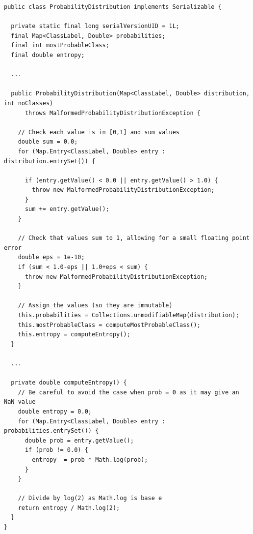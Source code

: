 \documentclass[12pt,twoside,notitlepage]{report}
\begin{document}
                \begin{lstlisting}[caption={The \texttt{ProbabilityDistribution} declaration, used to provide a 
                probability distribution over \texttt{ClassLabel}s.}]
public class ProbabilityDistribution implements Serializable {

  private static final long serialVersionUID = 1L;
  final Map<ClassLabel, Double> probabilities;
  final int mostProbableClass;
  final double entropy;

  ...

  public ProbabilityDistribution(Map<ClassLabel, Double> distribution, int noClasses) 
      throws MalformedProbabilityDistributionException {
    
    // Check each value is in [0,1] and sum values
    double sum = 0.0;
    for (Map.Entry<ClassLabel, Double> entry : distribution.entrySet()) {

      if (entry.getValue() < 0.0 || entry.getValue() > 1.0) {
        throw new MalformedProbabilityDistributionException;
      }
      sum += entry.getValue();
    }
    
    // Check that values sum to 1, allowing for a small floating point error
    double eps = 1e-10;
    if (sum < 1.0-eps || 1.0+eps < sum) {
      throw new MalformedProbabilityDistributionException;
    }
    
    // Assign the values (so they are immutable)
    this.probabilities = Collections.unmodifiableMap(distribution);
    this.mostProbableClass = computeMostProbableClass();
    this.entropy = computeEntropy();
  }

  ...

  private double computeEntropy() {
    // Be careful to avoid the case when prob = 0 as it may give an NaN value
    double entropy = 0.0; 
    for (Map.Entry<ClassLabel, Double> entry : probabilities.entrySet()) {
      double prob = entry.getValue();
      if (prob != 0.0) {
        entropy -= prob * Math.log(prob);
      }
    }
    
    // Divide by log(2) as Math.log is base e
    return entropy / Math.log(2);
  }
}
                \end{lstlisting}
\end{document}
